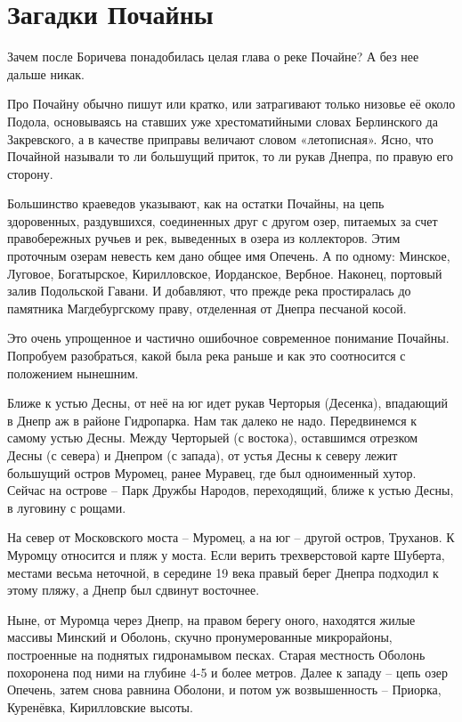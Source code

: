 \chapter{Загадки Почайны}

Зачем после Боричева понадобилась целая глава о реке Почайне? А без нее дальше никак.

Про Почайну обычно пишут или кратко, или затрагивают только низовье её около Подола, основываясь на ставших уже хрестоматийными словах Берлинского да Закревского, а в качестве приправы величают словом «летописная». Ясно, что Почайной называли то ли большущий приток, то ли рукав Днепра, по правую его сторону.

Большинство краеведов указывают, как на остатки Почайны, на цепь здоровенных, раздувшихся, соединенных друг с другом озер, питаемых за счет правобережных ручьев и рек, выведенных в озера из коллекторов. Этим проточным озерам невесть кем дано общее имя Опечень. А по одному: Минское, Луговое, Богатырское, Кирилловское, Иорданское, Вербное. Наконец, портовый залив Подольской Гавани. И добавляют, что прежде река простиралась до памятника Магдебургскому праву, отделенная от Днепра песчаной косой.

Это очень упрощенное и частично ошибочное современное понимание Почайны. Попробуем разобраться, какой была река раньше и как это соотносится с положением нынешним.

Ближе к устью Десны, от неё на юг идет рукав Черторыя (Десенка), впадающий в Днепр аж в районе Гидропарка. Нам так далеко не надо. Передвинемся к самому устью Десны. Между Черторыей (с востока), оставшимся отрезком Десны (с севера) и Днепром (с запада), от устья Десны к северу лежит большущий остров Муромец, ранее Муравец, где был одноименный хутор. Сейчас на острове – Парк Дружбы Народов, переходящий, ближе к устью Десны, в луговину с рощами.

На север от Московского моста – Муромец, а на юг – другой остров, Труханов. К Муромцу относится и пляж у моста. Если верить трехверстовой карте Шуберта, местами весьма неточной, в середине 19 века правый берег Днепра подходил к этому пляжу, а Днепр был сдвинут восточнее.

Ныне, от Муромца через Днепр, на правом берегу оного, находятся жилые массивы Минский и Оболонь, скучно пронумерованные микрорайоны, построенные на поднятых гидронамывом песках.  Старая местность Оболонь похоронена под ними на глубине 4-5 и более метров. Далее к западу – цепь озер Опечень, затем снова равнина Оболони, и потом уж возвышенность – Приорка, Куренёвка, Кирилловские высоты.

